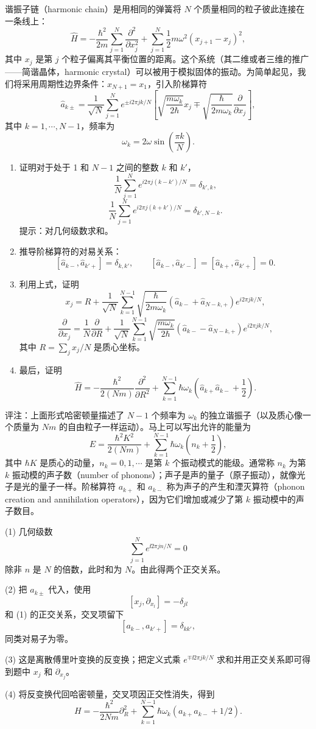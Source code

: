 \begin{question}
谐振子链（harmonic chain）是用相同的弹簧将 $N$ 个质量相同的粒子彼此连接在一条线上：
\[
\hat H=-\frac{\hbar^2}{2m}\sum_{j=1}^{N}\frac{\partial^2}{\partial x_j^2}
+\sum_{j=1}^{N}\frac12 m\omega^2(x_{j+1}-x_j)^2,
\]
其中 $x_j$ 是第 $j$ 个粒子偏离其平衡位置的距离。这个系统（其二维或者三维的推广——简谐晶体，harmonic crystal）可以被用于模拟固体的振动。为简单起见，我们将采用周期性边界条件：$x_{N+1}=x_1$，引入阶梯算符
\[
\hat a_{k\pm}=\frac{1}{\sqrt N}\sum_{j=1}^{N}e^{\pm i2\pi jk/N}\left[\sqrt{\frac{m\omega_k}{2\hbar}}x_j\mp\sqrt{\frac{\hbar}{2m\omega_k}}\frac{\partial}{\partial x_j}\right],
\]
其中 $k=1,\cdots,N-1$，频率为
\[
\omega_k=2\omega\sin\left(\frac{\pi k}{N}\right).
\]
\begin{enumerate}
\item 证明对于处于 1 和 $N-1$ 之间的整数 $k$ 和 $k'$，
\[
\frac{1}{N}\sum_{j=1}^{N}e^{i2\pi j(k-k')/N}=\delta_{k',k},
\]
\[
\frac{1}{N}\sum_{j=1}^{N}e^{i2\pi j(k+k')/N}=\delta_{k',N-k}.
\]
提示：对几何级数求和。
\item 推导阶梯算符的对易关系：
\[
[\hat a_{k-},\hat a_{k'+}]=\delta_{k,k'},\qquad
[\hat a_{k-},\hat a_{k'-}]=[\hat a_{k+},\hat a_{k'+}]=0.
\]
\item 利用上式，证明
\[
x_j=R+\frac{1}{\sqrt N}\sum_{k=1}^{N-1}\sqrt{\frac{\hbar}{2m\omega_k}}(\hat a_{k-}+\hat a_{N-k,+})e^{i2\pi jk/N},
\]
\[
\frac{\partial}{\partial x_j}=\frac{1}{N}\frac{\partial}{\partial R}+\frac{1}{\sqrt N}\sum_{k=1}^{N-1}\sqrt{\frac{m\omega_k}{2\hbar}}(\hat a_{k-}-\hat a_{N-k,+})e^{i2\pi jk/N},
\]
其中 $R=\sum_j x_j/N$ 是质心坐标。
\item 最后，证明
\[
\hat H=-\frac{\hbar^2}{2(Nm)}\frac{\partial^2}{\partial R^2}+\sum_{k=1}^{N-1}\hbar\omega_k\left(\hat a_{k+}\hat a_{k-}+\frac12\right).
\]
\end{enumerate}
评注：上面形式哈密顿量描述了 $N-1$ 个频率为 $\omega_k$ 的独立谐振子（以及质心像一个质量为 $Nm$ 的自由粒子一样运动）。马上可以写出允许的能量为
\[
E=\frac{\hbar^2K^2}{2(Nm)}+\sum_{k=1}^{N-1}\hbar\omega_k\left(n_k+\frac12\right),
\]
其中 $\hbar K$ 是质心的动量，$n_k=0,1,\cdots$ 是第 $k$ 个振动模式的能级。通常称 $n_k$ 为第 $k$ 振动模的声子数（number of phonons）；声子是声的量子（原子振动），就像光子是光的量子一样。阶梯算符 $a_{k+}$ 和 $a_{k-}$ 称为声子的产生和湮灭算符（phonon creation and annihilation operators），因为它们增加或减少了第 $k$ 振动模中的声子数目。
\end{question}
\begin{solution}

(1) 几何级数
\[
\sum_{j=1}^Ne^{\ii2\pi jn/N}=0
\]
除非 $n$ 是 $N$ 的倍数，此时和为 $N$。由此得两个正交关系。

(2) 把 $a_{k\pm}$ 代入，使用
\[
[x_j,\partial_{x_l}]=-\delta_{jl}
\]
和 (1) 的正交关系，交叉项留下
\[
[a_{k-},a_{k'+}]=\delta_{kk'},
\]
同类对易子为零。

(3) 这是离散傅里叶变换的反变换；把定义式乘 $e^{\mp\ii2\pi jk/N}$ 求和并用正交关系即可得到题中 $x_j$ 和 $\partial_{x_j}$。

(4) 将反变换代回哈密顿量，交叉项因正交性消失，得到
\[
H=-\frac{\hbar^2}{2Nm}\partial_R^2+
\sum_{k=1}^{N-1}\hbar\omega_k(a_{k+}a_{k-}+1/2).
\]

\end{solution}

